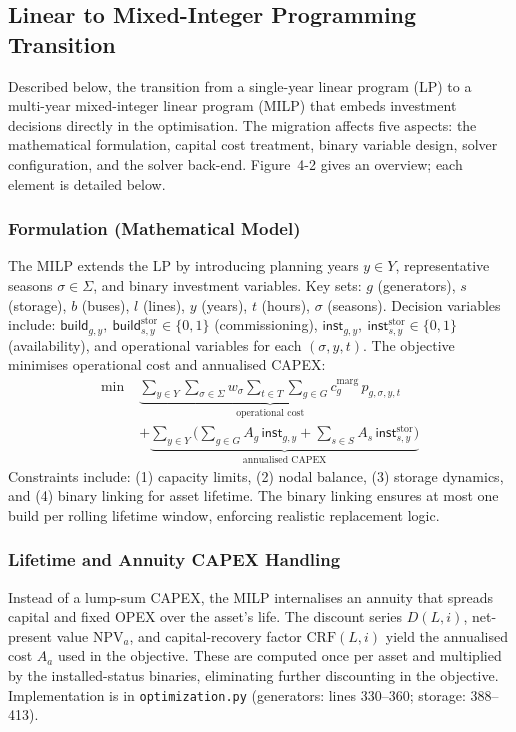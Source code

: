 \subsection{Linear to Mixed-Integer Programming Transition}

Described below, the transition from a single-year linear program (LP) to a multi-year mixed-integer linear 
program (MILP) that embeds investment decisions directly in the optimisation. The migration affects five aspects: 
the mathematical formulation, capital cost treatment, binary variable design, solver configuration, and the solver 
back-end. Figure~4-2 gives an overview; each element is detailed below.

\subsubsection{Formulation (Mathematical Model)}

The MILP extends the LP by introducing planning years $y \in Y$, representative seasons $\sigma \in \Sigma$, and 
binary investment variables. Key sets: $g$ (generators), $s$ (storage), $b$ (buses), $l$ (lines), $y$ (years), 
$t$ (hours), $\sigma$ (seasons).
Decision variables include: $\textsf{build}_{g,y},\ \textsf{build}^{\text{stor}}_{s,y} \in \{0,1\}$ 
(commissioning), $\textsf{inst}_{g,y},\ \textsf{inst}^{\text{stor}}_{s,y} \in \{0,1\}$ (availability), and operational 
variables for each $(\sigma, y, t)$. The objective minimises operational cost and annualised CAPEX:
\begin{align*}
\min\; & \underbrace{\sum_{y\in Y}\sum_{\sigma\in\Sigma}w_\sigma \sum_{t\in T}\sum_{g\in G} c^{\text{marg}}_g\,
p_{g,\sigma,y,t}}_{\text{operational cost}} \\
&+ \underbrace{\sum_{y\in Y}\Bigg( \sum_{g\in G}A_g\,\textsf{inst}_{g,y}+ 
\sum_{s\in S}A_s\,\textsf{inst}^{\text{stor}}_{s,y}\Bigg)}_{\text{annualised CAPEX}}
\end{align*}
Constraints include: (1) capacity limits, (2) nodal balance, (3) storage dynamics, and (4) binary linking for asset 
lifetime. The binary linking ensures at most one build per rolling lifetime window, enforcing realistic replacement 
logic.

\subsubsection{Lifetime and Annuity CAPEX Handling}

Instead of a lump-sum CAPEX, the MILP internalises an annuity that spreads capital and fixed OPEX over the asset's life. 
The discount series $D(L,i)$, net-present value $\text{NPV}_a$, and capital-recovery factor $\text{CRF}(L,i)$ yield the 
annualised cost $A_a$ used in the objective. These are computed once per asset and multiplied by the installed-status binaries, 
eliminating further discounting in the objective. Implementation is in \texttt{optimization.py} (generators: lines 330--360; 
storage: 388--413).

